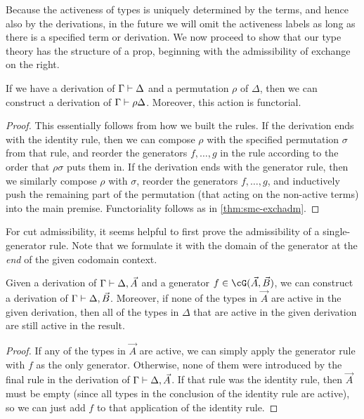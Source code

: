 \begin{props}
Because the activeness of types is uniquely determined by the terms, and hence also by the derivations, in the future we will omit the activeness labels as long as there is a specified term or derivation.
We now proceed to show that our type theory has the structure of a prop, beginning with the admissibility of exchange on the right.

\begin{lem}\label{thm:prop-symadm}
  If we have a derivation of $\Gamma\vdash \Delta$ and a permutation $\rho$ of $\Delta$, then we can construct a derivation of $\Gamma\vdash \rho\Delta$.
  Moreover, this action is functorial.
\end{lem}
\begin{proof}
  This essentially follows from how we built the rules.
  If the derivation ends with the identity rule, then we can compose $\rho$ with the specified permutation $\sigma$ from that rule, and reorder the generators $f,\dots,g$ in the rule according to the order that $\rho\sigma$ puts them in.
  If the derivation ends with the generator rule, then we similarly compose $\rho$ with $\sigma$, reorder the generators $f,\dots,g$, and inductively push the remaining part of the permutation (that acting on the non-active terms) into the main premise.
  Functoriality follows as in \cref{thm:smc-exchadm}.
\end{proof}

For cut admissibility, it seems helpful to first prove the admissibility of a single-generator rule.
Note that we formulate it with the domain of the generator at the \emph{end} of the given codomain context.

\begin{lem}\label{thm:prop-onecutadm}
  Given a derivation of $\Gamma\vdash \Delta,\vec A$ and a generator $f\in \cG(\vec A,\vec B)$, we can construct a derivation of $\Gamma\vdash \Delta,\vec B$.
  Moreover, if none of the types in $\vec A$ are active in the given derivation, then all of the types in $\Delta$ that are active in the given derivation are still active in the result.
\end{lem}
\begin{proof}
  If any of the types in $\vec A$ are active, we can simply apply the generator rule with $f$ as the only generator.
  Otherwise, none of them were introduced by the final rule in the derivation of $\Gamma\vdash \Delta,\vec A$.
  If that rule was the identity rule, then $\vec A$ must be empty (since all types in the conclusion of the identity rule are active), so we can just add $f$ to that application of the identity rule.


\end{proof}
\end{props}
